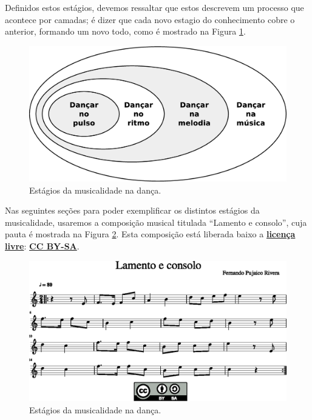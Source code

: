 Definidos estos estágios, 
devemos ressaltar que estos descrevem um processo que acontece por camadas;
é dizer que cada novo estagio do conhecimento cobre o anterior, formando um novo todo,
como é mostrado na Figura \ref{fig:aspectos-musica}.
\begin{figure}[h!]
    \centering
    \includegraphics[width=\textwidth]{chapters/cap-musicalidade-tecnica/aspectos-musica.eps}
    \caption{Estágios da musicalidade na dança.}
    \label{fig:aspectos-musica}
\end{figure}


Nas seguintes seções para poder exemplificar os distintos estágios da musicalidade,
usaremos a composição musical titulada ``Lamento e consolo'',
cuja pauta é mostrada na Figura \ref{fig:lamento-e-consolo}.
Esta composição está liberada baixo a 
\hyperref[ref:licensalivre]{\textbf{licença livre}}:
\hyperref[subsec:CCBYSA]{\textbf{CC BY-SA}}.

\begin{figure}
    \centering
    \includegraphics[width=\textwidth]{chapters/cap-musicalidade-tecnica/lamento-e-consolo-1.eps}
    \caption{Estágios da musicalidade na dança.}
    \label{fig:lamento-e-consolo}
\end{figure}

